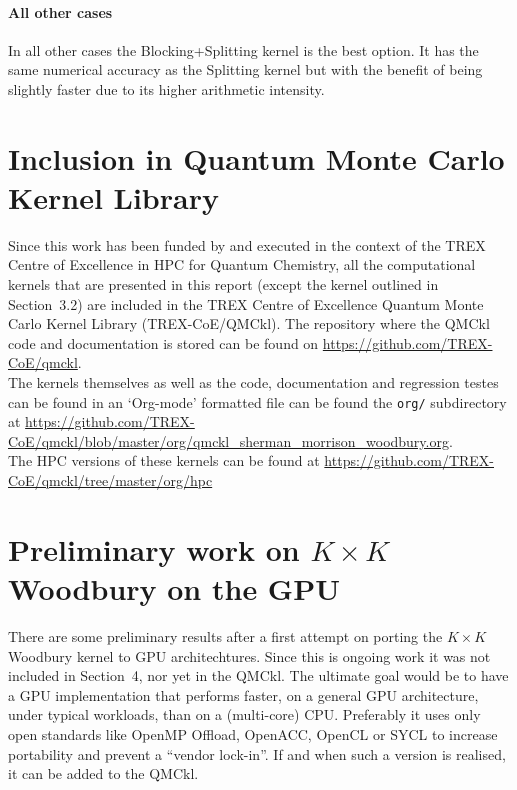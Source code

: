\documentclass[11pt]{article}
\numberwithin{figure}{section}
\numberwithin{table}{section}
\begin{document}
    \paragraph{All other cases} In all other cases the Blocking+Splitting kernel is the best option. It has the same numerical accuracy as the Splitting kernel but with the benefit of being slightly faster due to its higher arithmetic intensity. 

  \section{Inclusion in Quantum Monte Carlo Kernel Library}
    Since this work has been funded by and executed in the context of the TREX Centre of Excellence in HPC for Quantum Chemistry, all the computational kernels that are presented in this report (except the kernel outlined in Section~3.2) are included in the TREX Centre of Excellence Quantum Monte Carlo Kernel Library (TREX-CoE/QMCkl). The repository where the QMCkl code and documentation is stored can be found on \url{https://github.com/TREX-CoE/qmckl}.\\
    
    The kernels themselves as well as the code, documentation and regression testes can be found in an `Org-mode' formatted file can be found the \texttt{org/} subdirectory at \url{https://github.com/TREX-CoE/qmckl/blob/master/org/qmckl_sherman_morrison_woodbury.org}.\\
    
    The HPC versions of these kernels can be found at \url{https://github.com/TREX-CoE/qmckl/tree/master/org/hpc}
    
  \newpage
  \section{Preliminary work on $K\times K$ Woodbury on the GPU}
    There are some preliminary results after a first attempt on porting the $K\times K$ Woodbury kernel to GPU architechtures. Since this is ongoing work it was not included in Section~4, nor yet in the QMCkl. The ultimate goal would be to have a GPU implementation that performs faster, on a general GPU architecture,  under typical workloads, than on a (multi-core) CPU. Preferably it uses only open standards like OpenMP Offload, OpenACC, OpenCL or SYCL to increase portability and prevent a ``vendor lock-in''. If and when such a version is realised, it can be added to the QMCkl.\\
      
\end{document}
